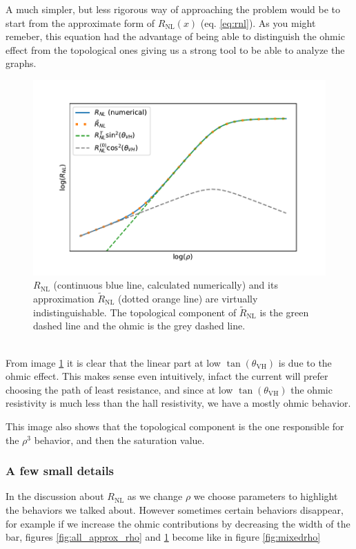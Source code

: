 A much simpler, but less rigorous way of approaching the problem would be to start from the approximate form of $R_{\textrm{NL}}(x)$ (eq. \ref{eq:rnl}). As you might remeber, this equation had the advantage of being able to distinguish the ohmic effect from the topological ones giving us a strong tool to be able to analyze the graphs.
\begin{figure}[h!]
    \centering
    \includegraphics[width=\linewidth]{Immagini/rnl/two_approx_rho.pdf}
    \caption{$R_{\textrm{NL}}$ (continuous blue line, calculated numerically) and its approximation $\tilde R_{\textrm{NL}}$ (dotted orange line) are virtually indistinguishable. The topological component of $\tilde R_{\textrm{NL}}$ is the green dashed line and the ohmic is the grey dashed line.}
    \label{fig:two_approx_rho}
\end{figure}\\

From image \ref{fig:two_approx_rho} it is clear that the linear part at low $\tan(\theta_{\textrm{VH}})$ is due to the ohmic effect. This makes sense even intuitively, infact the current will prefer choosing the path of least resistance, and since at low $\tan(\theta_{\textrm{VH}})$ the ohmic resistivity is much less than the hall resistivity, we have a mostly ohmic behavior.

This image also shows that the topological component is the one responsible for the $\rho^3$ behavior, and then the saturation value.

\subsubsection*{A few small details}
In the discussion about $R_{\textrm{NL}}$ as we change $\rho$ we choose parameters to highlight the behaviors we talked about. However sometimes certain behaviors disappear, for example if we increase the ohmic contributions by decreasing the width of the bar, figures \ref{fig:all_approx_rho} and \ref{fig:two_approx_rho} become like in figure \ref{fig:mixedrho}

